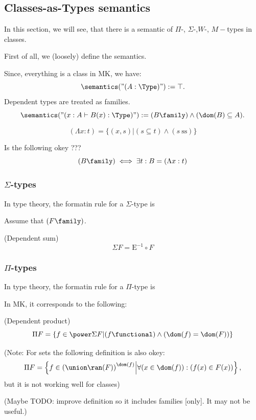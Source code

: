 \def\topic{}


\subsection{Classes-as-Types semantics}
In this section, we will see, that there is a semantic of $\Pi$-, $\Sigma$-,$W$-, $M-$types in classes.

First of all, we (loosely) define the semantics.

Since, everything is a class in MK, we have:
\[
\semantics("(A:\Type)"):=\top.
\]
Dependent types are treated as families.
\[
\semantics("(x:A\vdash B(x):\Type)"):=(B\family)\land(\dom(B)\subseteq A).
\]

\[
(\Lambda x: t) = \{(x,s)|(s\subseteq t)\land (s\ \mbox{ss})\}
\]

Is the following okey ???
\[
(B\family)\iff\exists t : B = (\Lambda x: t) 
\]

\subsubsection{$\Sigma$-types}

In type theory, the formatin rule for a $\Sigma$-type is
\begin{prooftree}
\end{prooftree}

Assume that $(F\family)$.

\begin{definition}(Dependent sum)
\[
\Sigma F = \mbox{E}^{-1} \circ F
\]
\end{definition}

\subsubsection{$\Pi$-types}
In type theory, the formatin rule for a $\Pi$-type is
\begin{prooftree}
\end{prooftree}

In MK, it corresponds to the following:

\begin{definition}(Dependent product)
\[
\Pi F = \{f\in \power \Sigma F | (f\functional) \land (\dom(f)=\dom(F)) \}
\]


(Note: For sets the following definition is also okey:
\[
\Pi F = \left\{f\in \left(\union\ran(F)\right)^{\dom(f)} \middle| \forall (x\in\dom(f)) : (f(x) \in F(x)) \right\},
\]
but it is not working well for classes)

(Maybe TODO: improve definition so it includes families [only]. It may not be useful.)

\end{definition}


